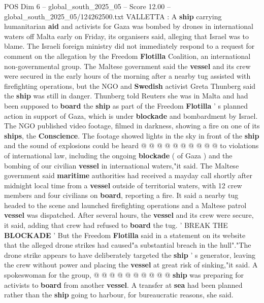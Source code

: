 \begin{textsample}{POS Dim 6 – global\_south\_2025\_05 – Score 12.00 – global\_south\_2025\_05/124262500.txt}  \label{ex:f6_pos_051}
VALLETTA : A \textbf{ship} carrying humanitarian \textbf{aid} and activists for Gaza was bombed by drones in international waters off Malta early on Friday, its organisers said, alleging that Israel was to blame.
The Israeli foreign ministry did not immediately respond to a request for comment on the allegation by the Freedom \textbf{Flotilla} Coalition, an international non-governmental group.
The Maltese government said the \textbf{vessel} and its crew were secured in the early hours of the morning after a nearby tug assisted with firefighting operations, but the NGO and \textbf{Swedish} activist Greta Thunberg said the \textbf{ship} was still in danger.
Thunberg told Reuters she was in Malta and had been supposed to \textbf{board} the \textbf{ship} as part of the Freedom \textbf{Flotilla} ' s planned action in support of Gaza, which is under \textbf{blockade} and bombardment by Israel.
The NGO published video footage, filmed in darkness, showing a fire on one of its \textbf{ships}, the \textbf{Conscience}.
The footage showed lights in the sky in front of the \textbf{ship} and the sound of explosions could be heard @ @ @ @ @ @ @ @ @ @ to violations of international law, including the ongoing \textbf{blockade} ( of Gaza ) and the bombing of our civilian \textbf{vessel} in international waters,"it said.
The Maltese government said \textbf{maritime} authorities had received a mayday call shortly after midnight local time from a \textbf{vessel} outside of territorial waters, with 12 crew members and four civilians on \textbf{board}, reporting a fire.
It said a nearby tug headed to the scene and launched firefighting operations and a Maltese patrol \textbf{vessel} was dispatched.
After several hours, the \textbf{vessel} and its crew were secure, it said, adding that crew had refused to \textbf{board} the tug. ' BREAK THE \textbf{BLOCKADE} ' But the Freedom \textbf{Flotilla} said in a statement on its website that the alleged drone strikes had caused"a substantial breach in the hull"."The drone strike appears to have deliberately targeted the \textbf{ship} ' s generator, leaving the crew without power and placing the \textbf{vessel} at great risk of sinking,"it said.
A spokeswoman for the group, @ @ @ @ @ @ @ @ @ @ \textbf{ship} was preparing for activists to \textbf{board} from another \textbf{vessel}.
A transfer at \textbf{sea} had been planned rather than the \textbf{ship} going to harbour, for bureaucratic reasons, she said.

\end{textsample}
